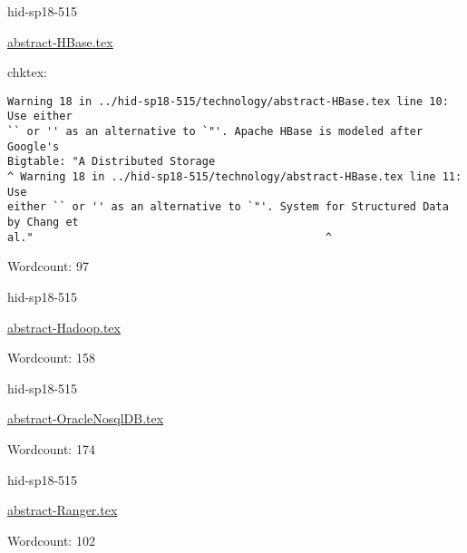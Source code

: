 \begin{IU}

hid-sp18-515

\href{https://github.com/cloudmesh-community/hid-sp18-515/blob/master//technology/abstract-HBase.tex}{abstract-HBase.tex}

 
chktex:
\begin{tiny}
\begin{verbatim}
Warning 18 in ../hid-sp18-515/technology/abstract-HBase.tex line 10: Use either
`` or '' as an alternative to `"'. Apache HBase is modeled after Google's
Bigtable: "A Distributed Storage
^ Warning 18 in ../hid-sp18-515/technology/abstract-HBase.tex line 11: Use
either `` or '' as an alternative to `"'. System for Structured Data by Chang et
al."                                             ^
\end{verbatim}
\end{tiny}

Wordcount: 97

\end{IU}



\begin{IU}

hid-sp18-515

\href{https://github.com/cloudmesh-community/hid-sp18-515/blob/master//technology/abstract-Hadoop.tex}{abstract-Hadoop.tex}

 

Wordcount: 158

\end{IU}



\begin{IU}

hid-sp18-515

\href{https://github.com/cloudmesh-community/hid-sp18-515/blob/master//technology/abstract-OracleNosqlDB.tex}{abstract-OracleNosqlDB.tex}

 

Wordcount: 174

\end{IU}



\begin{IU}

hid-sp18-515

\href{https://github.com/cloudmesh-community/hid-sp18-515/blob/master//technology/abstract-Ranger.tex}{abstract-Ranger.tex}

 

Wordcount: 102

\end{IU}

